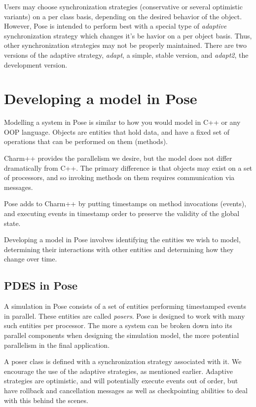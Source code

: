 \documentclass[10pt]{article}
\newcommand{\pose}{{\sc Pose}}
\begin{document}
Users may choose synchronization strategies (conservative or several
optimistic variants) on a per class basis, depending on the desired
behavior of the object.  However, \pose{} is intended to perform best
with a special type of {\it adaptive} synchronization strategy which
changes it's be havior on a per object basis.  Thus, other
synchronization strategies may not be properly maintained.  There are
two versions of the adaptive strategy, {\sl adapt}, a simple, stable
version, and {\sl adapt2}, the development version.

\section{Developing a model in \pose{}}

Modelling a system in \pose{} is similar to how you would model in C++ or
any OOP language.  Objects are entities that hold data, and have a
fixed set of operations that can be performed on them (methods).

Charm++ provides the parallelism we desire, but the model does not
differ dramatically from C++.  The primary difference is that objects
may exist on a set of processors, and so invoking methods on them
requires communication via messages. 

\pose{} adds to Charm++ by putting timestamps on method invocations
(events), and executing events in timestamp order to preserve the
validity of the global state.

Developing a model in \pose{} involves identifying the entities we
wish to model, determining their interactions with other entities and
determining how they change over time.

\subsection{PDES in \pose{}}

A simulation in \pose{} consists of a set of entities performing
timestamped events in parallel.  These entities are called {\sl
posers}.  \pose{} is designed to work with many such entities per
processor. The more a system can be broken down into its parallel
components when designing the simulation model, the more potential
parallelism in the final application.

A poser class is defined with a synchronization strategy associated
with it.  We encourage the use of the adaptive strategies, as
mentioned earlier.  Adaptive strategies are optimistic, and will
potentially execute events out of order, but have rollback and
cancellation messages as well as checkpointing abilities to deal with
this behind the scenes.
\end{document}
